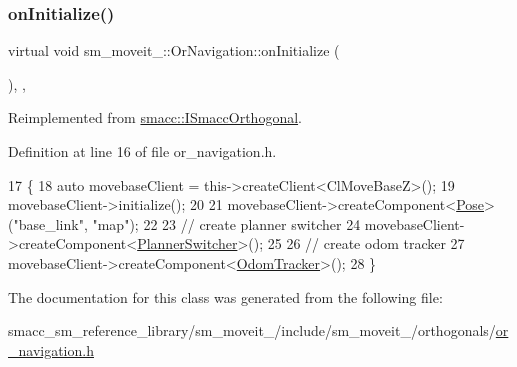 \subsubsection{\texorpdfstring{on\+Initialize()}{onInitialize()}}
{\footnotesize\ttfamily virtual void sm\+\_\+moveit\+\_\+::\+Or\+Navigation\+::on\+Initialize (\begin{DoxyParamCaption}{ }\end{DoxyParamCaption})\hspace{0.3cm}{\ttfamily [inline]}, {\ttfamily [override]}, {\ttfamily [virtual]}}



Reimplemented from \hyperlink{classsmacc_1_1ISmaccOrthogonal_a6bb31c620cb64dd7b8417f8705c79c7a}{smacc\+::\+I\+Smacc\+Orthogonal}.



Definition at line 16 of file or\+\_\+navigation.\+h.


\begin{DoxyCode}
17     \{
18         \textcolor{keyword}{auto} movebaseClient = this->createClient<ClMoveBaseZ>();
19         movebaseClient->initialize();
20 
21         movebaseClient->createComponent<\hyperlink{classcl__move__base__z_1_1Pose}{Pose}>(\textcolor{stringliteral}{"base\_link"}, \textcolor{stringliteral}{"map"});
22 
23         \textcolor{comment}{// create planner switcher}
24         movebaseClient->createComponent<\hyperlink{classcl__move__base__z_1_1PlannerSwitcher}{PlannerSwitcher}>();
25 
26         \textcolor{comment}{// create odom tracker}
27         movebaseClient->createComponent<\hyperlink{classcl__move__base__z_1_1odom__tracker_1_1OdomTracker}{OdomTracker}>();
28     \}
\end{DoxyCode}


The documentation for this class was generated from the following file\+:\begin{DoxyCompactItemize}
\item 
smacc\+\_\+sm\+\_\+reference\+\_\+library/sm\+\_\+moveit\+\_/include/sm\+\_\+moveit\+\_/orthogonals/\hyperlink{sm__moveit__2_2include_2sm__moveit__2_2orthogonals_2or__navigation_8h}{or\+\_\+navigation.\+h}\end{DoxyCompactItemize}
